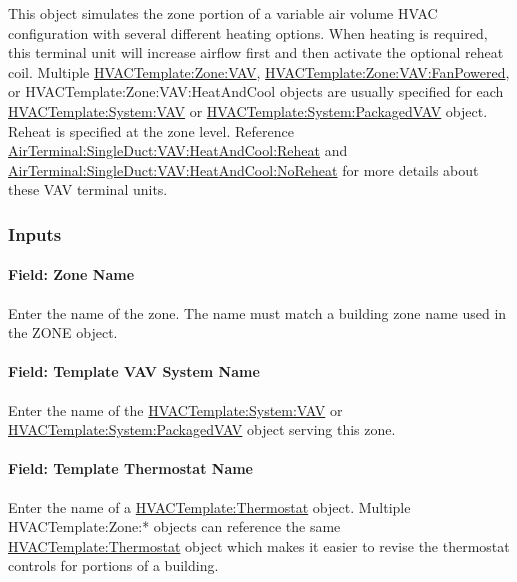 This object simulates the zone portion of a variable air volume HVAC configuration with several different heating options. When heating is required, this terminal unit will increase airflow first and then activate the optional reheat coil. Multiple \hyperref[hvactemplatezonevav]{HVACTemplate:Zone:VAV}, \hyperref[hvactemplatezonevavfanpowered]{HVACTemplate:Zone:VAV:FanPowered}, or HVACTemplate:Zone:VAV:HeatAndCool objects are usually specified for each \hyperref[hvactemplatesystemvav]{HVACTemplate:System:VAV} or \hyperref[hvactemplatesystempackagedvav]{HVACTemplate:System:PackagedVAV} object. Reheat is specified at the zone level. Reference \hyperref[airterminalsingleductvavheatandcoolreheat]{AirTerminal:SingleDuct:VAV:HeatAndCool:Reheat} and \hyperref[airterminalsingleductvavheatandcoolnoreheat]{AirTerminal:SingleDuct:VAV:HeatAndCool:NoReheat} for more details about these VAV terminal units.

\subsubsection{Inputs}\label{inputs-11-006}

\paragraph{Field: Zone Name}\label{field-zone-name-10}

Enter the name of the zone. The name must match a building zone name used in the ZONE object.

\paragraph{Field: Template VAV System Name}\label{field-template-vav-system-name-2}

Enter the name of the \hyperref[hvactemplatesystemvav]{HVACTemplate:System:VAV} or \hyperref[hvactemplatesystempackagedvav]{HVACTemplate:System:PackagedVAV} object serving this zone.

\paragraph{Field: Template Thermostat Name}\label{field-template-thermostat-name-10}

Enter the name of a \hyperref[hvactemplatethermostat]{HVACTemplate:Thermostat} object. Multiple HVACTemplate:Zone:* objects can reference the same \hyperref[hvactemplatethermostat]{HVACTemplate:Thermostat} object which makes it easier to revise the thermostat controls for portions of a building.


